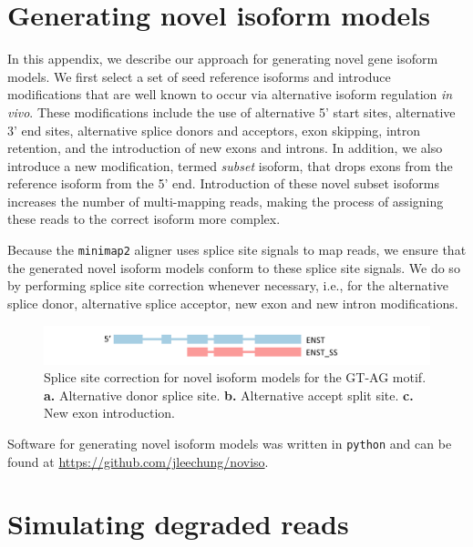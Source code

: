 
\chapter{Generating novel isoform models}\label{ap:gen-novl-iso}

In this appendix, we describe our approach for generating novel gene isoform models. We first select a set of seed reference isoforms and introduce modifications that are well known to occur via alternative isoform regulation \textit{in vivo}. These modifications include the use of alternative 5' start sites, alternative 3' end sites, alternative splice donors and acceptors, exon skipping, intron retention, and the introduction of new exons and introns. In addition, we also introduce a new modification, termed \textit{subset} isoform, that drops exons from the reference isoform from the 5' end. Introduction of these novel subset isoforms increases the number of multi-mapping reads, making the process of assigning these reads to the correct isoform more complex. 


Because the \texttt{minimap2} aligner uses splice site signals to map reads, we ensure that the generated novel isoform models conform to these splice site signals. We do so by performing splice site correction whenever necessary, i.e., for the alternative splice donor, alternative splice acceptor, new exon and new intron modifications. 

\begin{figure}[H]
    \centering
    \includegraphics[width=\textwidth]{figures/app-a-1.png}
    \caption[Splice site correction for novel isoform models]{Splice site correction for novel isoform models for the GT-AG motif. \textbf{a.} Alternative donor splice site. \textbf{b.} Alternative accept split site. \textbf{c.} New exon introduction.}
    \label{fig:app-a-1}
\end{figure}

Software for generating novel isoform models was written in \texttt{python} and can be found at \url{https://github.com/jleechung/noviso}.

\chapter{Simulating degraded reads}\label{ap:sim-deg-reads}

